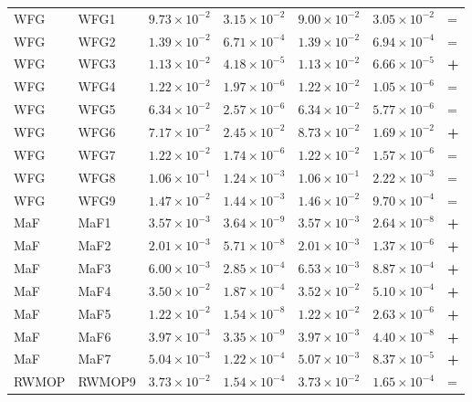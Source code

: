 \begin{table}[t]
\begin{tabular}{llrrrrl}
\addlinespace
WFG & WFG1 & $9.73\!\times\!10^{-2}$ & $3.15\!\times\!10^{-2}$ & $9.00\!\times\!10^{-2}$ & $3.05\!\times\!10^{-2}$ & = \\
WFG & WFG2 & $1.39\!\times\!10^{-2}$ & $6.71\!\times\!10^{-4}$ & $1.39\!\times\!10^{-2}$ & $6.94\!\times\!10^{-4}$ & = \\
WFG & WFG3 & $1.13\!\times\!10^{-2}$ & $4.18\!\times\!10^{-5}$ & $1.13\!\times\!10^{-2}$ & $6.66\!\times\!10^{-5}$ & \textbf{+} \\
WFG & WFG4 & $1.22\!\times\!10^{-2}$ & $1.97\!\times\!10^{-6}$ & $1.22\!\times\!10^{-2}$ & $1.05\!\times\!10^{-6}$ & = \\
WFG & WFG5 & $6.34\!\times\!10^{-2}$ & $2.57\!\times\!10^{-6}$ & $6.34\!\times\!10^{-2}$ & $5.77\!\times\!10^{-6}$ & = \\
WFG & WFG6 & $7.17\!\times\!10^{-2}$ & $2.45\!\times\!10^{-2}$ & $8.73\!\times\!10^{-2}$ & $1.69\!\times\!10^{-2}$ & \textbf{+} \\
WFG & WFG7 & $1.22\!\times\!10^{-2}$ & $1.74\!\times\!10^{-6}$ & $1.22\!\times\!10^{-2}$ & $1.57\!\times\!10^{-6}$ & = \\
WFG & WFG8 & $1.06\!\times\!10^{-1}$ & $1.24\!\times\!10^{-3}$ & $1.06\!\times\!10^{-1}$ & $2.22\!\times\!10^{-3}$ & = \\
WFG & WFG9 & $1.47\!\times\!10^{-2}$ & $1.44\!\times\!10^{-3}$ & $1.46\!\times\!10^{-2}$ & $9.70\!\times\!10^{-4}$ & = \\
\addlinespace
MaF & MaF1 & $3.57\!\times\!10^{-3}$ & $3.64\!\times\!10^{-9}$ & $3.57\!\times\!10^{-3}$ & $2.64\!\times\!10^{-8}$ & \textbf{+} \\
MaF & MaF2 & $2.01\!\times\!10^{-3}$ & $5.71\!\times\!10^{-8}$ & $2.01\!\times\!10^{-3}$ & $1.37\!\times\!10^{-6}$ & \textbf{+} \\
MaF & MaF3 & $6.00\!\times\!10^{-3}$ & $2.85\!\times\!10^{-4}$ & $6.53\!\times\!10^{-3}$ & $8.87\!\times\!10^{-4}$ & \textbf{+} \\
MaF & MaF4 & $3.50\!\times\!10^{-2}$ & $1.87\!\times\!10^{-4}$ & $3.52\!\times\!10^{-2}$ & $5.10\!\times\!10^{-4}$ & \textbf{+} \\
MaF & MaF5 & $1.22\!\times\!10^{-2}$ & $1.54\!\times\!10^{-8}$ & $1.22\!\times\!10^{-2}$ & $2.63\!\times\!10^{-6}$ & \textbf{+} \\
MaF & MaF6 & $3.97\!\times\!10^{-3}$ & $3.35\!\times\!10^{-9}$ & $3.97\!\times\!10^{-3}$ & $4.40\!\times\!10^{-8}$ & \textbf{+} \\
MaF & MaF7 & $5.04\!\times\!10^{-3}$ & $1.22\!\times\!10^{-4}$ & $5.07\!\times\!10^{-3}$ & $8.37\!\times\!10^{-5}$ & \textbf{+} \\
\addlinespace
RWMOP & RWMOP9 & $3.73\!\times\!10^{-2}$ & $1.54\!\times\!10^{-4}$ & $3.73\!\times\!10^{-2}$ & $1.65\!\times\!10^{-4}$ & = \\
\bottomrule
\end{tabular}
\end{table}
